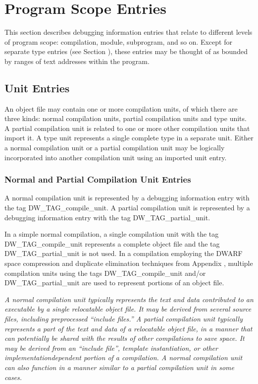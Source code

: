 \chapter{Program Scope Entries}
\label{chap:programscopeentries} 
This section describes debugging information entries that
relate to different levels of program scope: compilation,
module, subprogram, and so on. Except for separate type
entries (see Section ), 
these entries may be thought of
as bounded by ranges of text addresses within the program.

\section{Unit Entries}
An object file may contain one or more compilation units,
of which there are three kinds: normal compilation units,
partial compilation units and type units. A partial compilation
unit is related to one or more other compilation units that
import it. A type unit represents a single complete type in a
separate unit. Either a normal compilation unit or a partial
compilation unit may be logically incorporated into another
compilation unit using an imported unit entry.

\subsection[Normal and Partial CU Entries]{Normal and Partial Compilation Unit Entries}
\label{chap:normalandpartialcompilationunitentries}

A normal compilation unit is represented by a debugging
information entry with the tag DW\_TAG\_compile\_unit. A partial
compilation unit is represented by a debugging information
entry with the tag DW\_TAG\_partial\_unit.

In a simple normal compilation, a single compilation unit with
the tag 
DW\-\_TAG\-\_compile\-\_unit represents a complete object file
and the tag 
DW\-\_TAG\-\_partial\-\_unit is not used. 
In a compilation
employing the DWARF space compression and duplicate elimination
techniques from 
Appendix , 
multiple compilation units using
the tags 
DW\-\_TAG\-\_compile\-\_unit and/or 
DW\-\_TAG\-\_partial\-\_unit are
used to represent portions of an object file.

\textit{A normal compilation unit typically represents the text and
data contributed to an executable by a single relocatable
object file. It may be derived from several source files,
including pre\dash processed ``include files.'' A partial
compilation unit typically represents a part of the text
and data of a relocatable object file, in a manner that can
potentially be shared with the results of other compilations
to save space. It may be derived from an ``include file'',
template instantiation, or other implementation\dash dependent
portion of a compilation. A normal compilation unit can also
function in a manner similar to a partial compilation unit
in some cases.}

